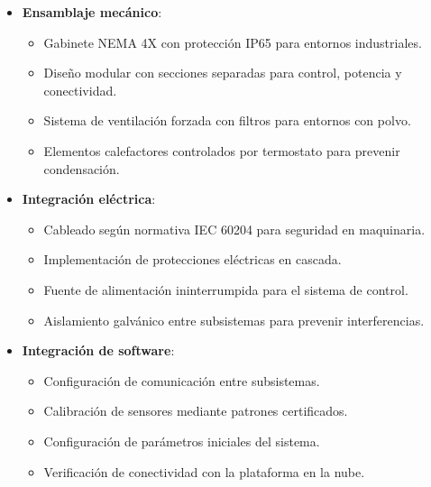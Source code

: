 \documentclass{report}          %
\begin{document}
                \begin{itemize}
                    \item \textbf{Ensamblaje mecánico}:
                    \begin{itemize}
                        \item Gabinete NEMA 4X con protección IP65 para entornos industriales.
                        \item Diseño modular con secciones separadas para control, potencia y conectividad.
                        \item Sistema de ventilación forzada con filtros para entornos con polvo.
                        \item Elementos calefactores controlados por termostato para prevenir condensación.
                    \end{itemize}
                    
                    \item \textbf{Integración eléctrica}:
                    \begin{itemize}
                        \item Cableado según normativa IEC 60204 para seguridad en maquinaria.
                        \item Implementación de protecciones eléctricas en cascada.
                        \item Fuente de alimentación ininterrumpida para el sistema de control.
                        \item Aislamiento galvánico entre subsistemas para prevenir interferencias.
                    \end{itemize}
                    
                    \item \textbf{Integración de software}:
                    \begin{itemize}
                        \item Configuración de comunicación entre subsistemas.
                        \item Calibración de sensores mediante patrones certificados.
                        \item Configuración de parámetros iniciales del sistema.
                        \item Verificación de conectividad con la plataforma en la nube.
                    \end{itemize}
                \end{itemize}
\end{document}
